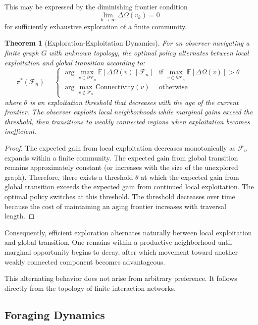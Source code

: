 \documentclass[12pt,oneside]{article}
\newtheorem{theorem}[definition]{Theorem}
\theoremstyle{remark}
\begin{document}
This may be expressed by the diminishing frontier condition
\[
\lim_{k\rightarrow\infty} \Delta\Omega(v_k) = 0
\]
for sufficiently exhaustive exploration of a finite community.

\begin{theorem}[Exploration-Exploitation Dynamics]
For an observer navigating a finite graph \(G\) with unknown topology, the optimal policy alternates between local exploitation and global transition according to:
\[
\pi^*( \mathcal{F}_n) =
\begin{cases}
\arg\max_{v \in \partial \mathcal{F}_n} \mathbb{E}[\Delta\Omega(v) \mid \mathcal{F}_n] & \text{if } \max_{v \in \partial \mathcal{F}_n} \mathbb{E}[\Delta\Omega(v)] > \theta \\
\arg\max_{v \notin \mathcal{F}_n} \text{Connectivity}(v) & \text{otherwise}
\end{cases}
\]
where \(\theta\) is an exploitation threshold that decreases with the age of the current frontier. The observer exploits local neighborhoods while marginal gains exceed the threshold, then transitions to weakly connected regions when exploitation becomes inefficient.
\end{theorem}

\begin{proof}
The expected gain from local exploitation decreases monotonically as \(\mathcal{F}_n\) expands within a finite community. The expected gain from global transition remains approximately constant (or increases with the size of the unexplored graph). Therefore, there exists a threshold \(\theta\) at which the expected gain from global transition exceeds the expected gain from continued local exploitation. The optimal policy switches at this threshold. The threshold decreases over time because the cost of maintaining an aging frontier increases with traversal length.
\end{proof}

Consequently, efficient exploration alternates naturally between local exploitation and global transition. One remains within a productive neighborhood until marginal opportunity begins to decay, after which movement toward another weakly connected component becomes advantageous.

This alternating behavior does not arise from arbitrary preference. It follows directly from the topology of finite interaction networks.

\subsection{Foraging Dynamics}
\end{document}
